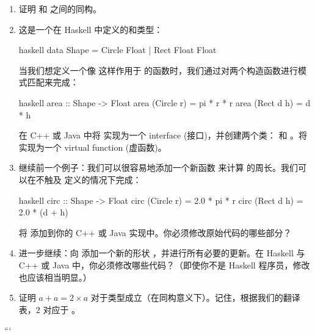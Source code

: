 \begin{enumerate}
  \tightlist
  \item
        证明  和  之间的同构。
  \item
        这是一个在 Haskell 中定义的和类型：

        \begin{snip}{haskell}
data Shape = Circle Float
           | Rect Float Float
\end{snip}
        当我们想定义一个像  这样作用于  的函数时，我们通过对两个构造函数进行模式匹配来完成：

        \begin{snip}{haskell}
area :: Shape -> Float
area (Circle r) = pi * r * r
area (Rect d h) = d * h
\end{snip}
        在 C++ 或 Java 中将  实现为一个 interface (接口)，并创建两个类： 和 。将  实现为一个 virtual function (虚函数)。
  \item
        继续前一个例子：我们可以很容易地添加一个新函数  来计算  的周长。我们可以在不触及  定义的情况下完成：

        \begin{snip}{haskell}
circ :: Shape -> Float
circ (Circle r) = 2.0 * pi * r
circ (Rect d h) = 2.0 * (d + h)
\end{snip}
        将  添加到你的 C++ 或 Java 实现中。你必须修改原始代码的哪些部分？
  \item
        进一步继续：向  添加一个新的形状 ，并进行所有必要的更新。在 Haskell 与 C++ 或 Java 中，你必须修改哪些代码？（即使你不是 Haskell 程序员，修改也应该相当明显。）
  \item
        证明 $a + a = 2 \times a$ 对于类型成立（在同构意义下）。记住，根据我们的翻译表，$2$ 对应于 。
\end{enumerate}
```